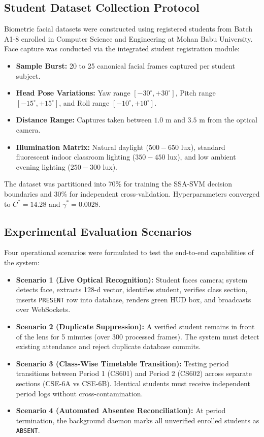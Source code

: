 \documentclass[conference]{IEEEtran}
\begin{document}
\subsection{Student Dataset Collection Protocol}
Biometric facial datasets were constructed using registered students from Batch A1-8 enrolled in Computer Science and Engineering at Mohan Babu University. Face capture was conducted via the integrated student registration module:
\begin{itemize}
    \item \textbf{Sample Burst:} 20 to 25 canonical facial frames captured per student subject.
    \item \textbf{Head Pose Variations:} Yaw range $[-30^\circ, +30^\circ]$, Pitch range $[-15^\circ, +15^\circ]$, and Roll range $[-10^\circ, +10^\circ]$.
    \item \textbf{Distance Range:} Captures taken between $1.0\text{ m}$ and $3.5\text{ m}$ from the optical camera.
    \item \textbf{Illumination Matrix:} Natural daylight ($500 - 650\text{ lux}$), standard fluorescent indoor classroom lighting ($350 - 450\text{ lux}$), and low ambient evening lighting ($250 - 300\text{ lux}$).
\end{itemize}

The dataset was partitioned into 70\% for training the SSA-SVM decision boundaries and 30\% for independent cross-validation. Hyperparameters converged to $C^* = 14.28$ and $\gamma^* = 0.0028$.

\subsection{Experimental Evaluation Scenarios}
Four operational scenarios were formulated to test the end-to-end capabilities of the system:
\begin{itemize}
    \item \textbf{Scenario 1 (Live Optical Recognition):} Student faces camera; system detects face, extracts 128-d vector, identifies student, verifies class section, inserts \texttt{PRESENT} row into database, renders green HUD box, and broadcasts over WebSockets.
    \item \textbf{Scenario 2 (Duplicate Suppression):} A verified student remains in front of the lens for 5 minutes (over 300 processed frames). The system must detect existing attendance and reject duplicate database commits.
    \item \textbf{Scenario 3 (Class-Wise Timetable Transition):} Testing period transitions between Period 1 (CS601) and Period 2 (CS602) across separate sections (CSE-6A vs CSE-6B). Identical students must receive independent period logs without cross-contamination.
    \item \textbf{Scenario 4 (Automated Absentee Reconciliation):} At period termination, the background daemon marks all unverified enrolled students as \texttt{ABSENT}.
\end{itemize}
\end{document}
